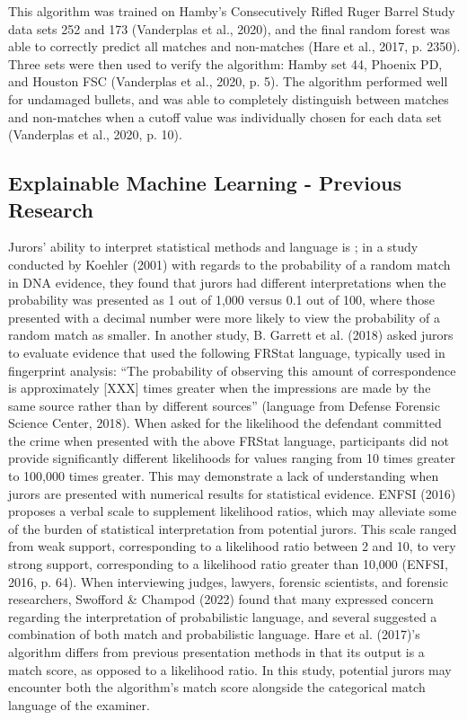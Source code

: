 \documentclass[print]{nuthesis}
\begin{document}
This algorithm was trained on Hamby's Consecutively Rifled Ruger Barrel Study data sets 252 and 173 (Vanderplas et al., 2020), and the final random forest was able to correctly predict all matches and non-matches (Hare et al., 2017, p. 2350).
Three sets were then used to verify the algorithm: Hamby set 44, Phoenix PD, and Houston FSC (Vanderplas et al., 2020, p. 5).
The algorithm performed well for undamaged bullets, and was able to completely distinguish between matches and non-matches when a cutoff value was individually chosen for each data set (Vanderplas et al., 2020, p. 10).

\hypertarget{explainable-machine-learning---previous-research}{%
\subsection{Explainable Machine Learning - Previous Research}\label{explainable-machine-learning---previous-research}}

Jurors' ability to interpret statistical methods and language is ; in a study conducted by Koehler (2001) with regards to the probability of a random match in DNA evidence, they found that jurors had different interpretations when the probability was presented as 1 out of 1,000 versus 0.1 out of 100, where those presented with a decimal number were more likely to view the probability of a random match as smaller.
In another study, B. Garrett et al. (2018) asked jurors to evaluate evidence that used the following FRStat language, typically used in fingerprint analysis: ``The probability of observing this amount of correspondence is approximately {[}XXX{]} times greater when the impressions are made by the same source rather than by different sources'' (language from Defense Forensic Science Center, 2018).
When asked for the likelihood the defendant committed the crime when presented with the above FRStat language, participants did not provide significantly different likelihoods for values ranging from 10 times greater to 100,000 times greater.
This may demonstrate a lack of understanding when jurors are presented with numerical results for statistical evidence.
ENFSI (2016) proposes a verbal scale to supplement likelihood ratios, which may alleviate some of the burden of statistical interpretation from potential jurors.
This scale ranged from weak support, corresponding to a likelihood ratio between 2 and 10, to very strong support, corresponding to a likelihood ratio greater than 10,000 (ENFSI, 2016, p. 64).
When interviewing judges, lawyers, forensic scientists, and forensic researchers, Swofford \& Champod (2022) found that many expressed concern regarding the interpretation of probabilistic language, and several suggested a combination of both match and probabilistic language.
Hare et al. (2017)'s algorithm differs from previous presentation methods in that its output is a match score, as opposed to a likelihood ratio.
In this study, potential jurors may encounter both the algorithm's match score alongside the categorical match language of the examiner.
\end{document}
